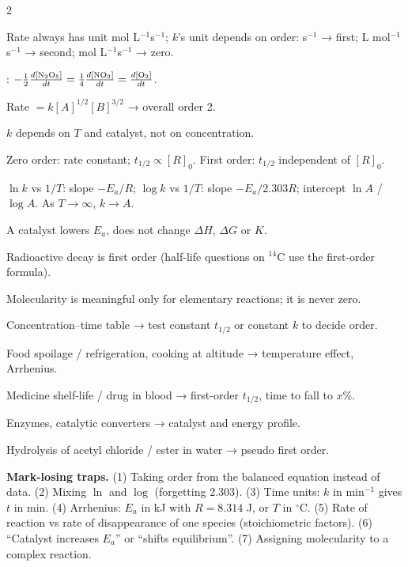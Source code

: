 \documentclass[10pt,a4paper]{extarticle}
\begin{document}
\begin{multicols}{2}
\begin{fl}
\item Rate always has unit mol L$^{-1}$s$^{-1}$; $k$'s unit depends on order: s$^{-1}$ → first; L mol$^{-1}$s$^{-1}$ → second; mol L$^{-1}$s$^{-1}$ → zero.
\item {}: $-\frac12\frac{d[\ce{N2O5}]}{dt}=\frac14\frac{d[\ce{NO2}]}{dt}=\frac{d[\ce{O2}]}{dt}$.
\item Rate $=k[A]^{1/2}[B]^{3/2}$ → overall order 2.
\item $k$ depends on $T$ and catalyst, not on concentration.
\item Zero order: rate constant; $t_{1/2}\propto[R]_0$. First order: $t_{1/2}$ independent of $[R]_0$.
\item $\ln k$ vs $1/T$: slope $-E_a/R$; $\log k$ vs $1/T$: slope $-E_a/2.303R$; intercept $\ln A$ / $\log A$. As $T\to\infty$, $k\to A$.
\item A catalyst lowers $E_a$, does not change $\Delta H$, $\Delta G$ or $K$.
\item Radioactive decay is first order (half-life questions on $^{14}$C use the first-order formula).
\item Molecularity is meaningful only for elementary reactions; it is never zero.
\end{fl}

\begin{fl}
\item Concentration--time table → test constant $t_{1/2}$ or constant $k$ to decide order.
\item Food spoilage / refrigeration, cooking at altitude → temperature effect, Arrhenius.
\item Medicine shelf-life / drug in blood → first-order $t_{1/2}$, time to fall to $x$\%.
\item Enzymes, catalytic converters → catalyst and energy profile.
\item Hydrolysis of acetyl chloride / ester in water → pseudo first order. \SQP
\end{fl}

\begin{tip}\Tip \textbf{Mark-losing traps.} (1) Taking order from the balanced equation instead of data. (2) Mixing $\ln$ and $\log$ (forgetting 2.303). (3) Time units: $k$ in min$^{-1}$ gives $t$ in min. (4) Arrhenius: $E_a$ in kJ with $R=8.314$ J, or $T$ in $^\circ$C. (5) Rate of reaction vs rate of disappearance of one species (stoichiometric factors). (6) ``Catalyst increases $E_a$'' or ``shifts equilibrium''. (7) Assigning molecularity to a complex reaction.\end{tip}
\end{multicols}
\begin{tcolorbox}[enhanced,colback=white,colframe=uc,boxrule=0.6pt,arc=2pt,title={\sffamily\bfseries\footnotesize My notes — Ch 3 Chemical Kinetics},colbacktitle=uc,coltitle=white,height fill,before skip=4pt]
\end{tcolorbox}
\end{document}
